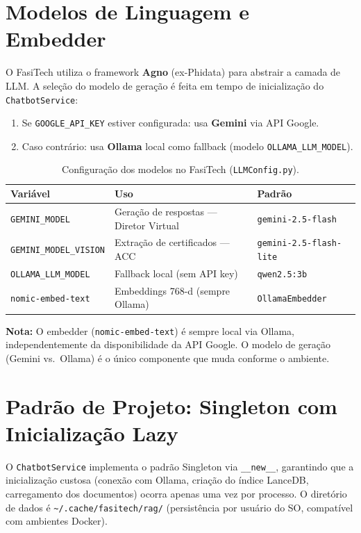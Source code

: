 \documentclass[12pt,a4paper]{report}
\begin{document}
\section{Modelos de Linguagem e Embedder}

O FasiTech utiliza o framework \textbf{Agno} (ex-Phidata) para abstrair
a camada de LLM. A seleção do modelo de geração é feita em tempo de
inicialização do \texttt{ChatbotService}:

\begin{enumerate}
  \item Se \texttt{GOOGLE\_API\_KEY} estiver configurada: usa
        \textbf{Gemini} via API Google.
  \item Caso contrário: usa \textbf{Ollama} \autocite{ollama2023} local como fallback
        (modelo \texttt{OLLAMA\_LLM\_MODEL}).
\end{enumerate}

\begin{table}[H]
\centering
\caption{Configuração dos modelos no FasiTech (\texttt{LLMConfig.py}).}
\begin{tabularx}{\textwidth}{lXX}
\toprule
\textbf{Variável} & \textbf{Uso} & \textbf{Padrão} \\
\midrule
\texttt{GEMINI\_MODEL} & Geração de respostas — Diretor Virtual & \texttt{gemini-2.5-flash} \\
\texttt{GEMINI\_MODEL\_VISION} & Extração de certificados — ACC & \texttt{gemini-2.5-flash-lite} \\
\texttt{OLLAMA\_LLM\_MODEL} & Fallback local (sem API key) & \texttt{qwen2.5:3b} \\
\texttt{nomic-embed-text} & Embeddings 768-d (sempre Ollama) & \texttt{OllamaEmbedder} \\
\bottomrule
\end{tabularx}
\end{table}

\noindent\textbf{Nota:} O embedder (\texttt{nomic-embed-text}) é sempre local via Ollama,
independentemente da disponibilidade da API Google. O modelo de geração
(Gemini vs.\ Ollama) é o único componente que muda conforme o ambiente.

\section{Padrão de Projeto: Singleton com Inicialização Lazy}

O \texttt{ChatbotService} implementa o padrão Singleton via \texttt{\_\_new\_\_},
garantindo que a inicialização custosa (conexão com Ollama, criação do
índice LanceDB, carregamento dos documentos) ocorra apenas uma vez por
processo. O diretório de dados é \texttt{\textasciitilde/.cache/fasitech/rag/}
(persistência por usuário do SO, compatível com ambientes Docker).
\end{document}
